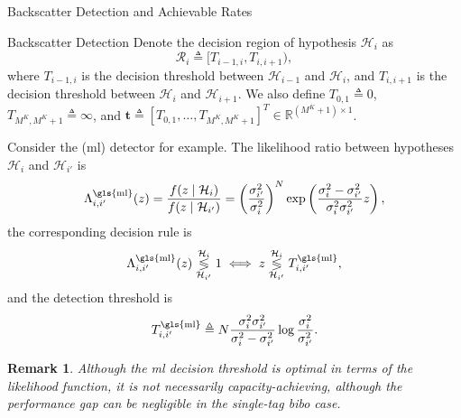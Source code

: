 \documentclass[journal]{IEEEtran}
\newtheorem{remark}{Remark}
\begin{document}
\begin{section}{Backscatter Detection and Achievable Rates}
\begin{subsection}{Backscatter Detection}
			Denote the decision region of hypothesis $\mathcal{H}_i$ as
			\begin{equation}
				\mathcal{R}_i \triangleq [T_{i-1,i}, T_{i,i+1}),
				\label{eq:decision_region}
			\end{equation}
			where $T_{i-1,i}$ is the decision threshold between $\mathcal{H}_{i-1}$ and $\mathcal{H}_i$, and $T_{i,i+1}$ is the decision threshold between $\mathcal{H}_i$ and $\mathcal{H}_{i+1}$. We also define $T_{0,1} \triangleq 0$, $T_{M^K,M^K+1} \triangleq \infty$, and $\boldsymbol{t} \triangleq [T_{0,1},\ldots,T_{M^K,M^K+1}]^T \in \mathbb{R}^{(M^K + 1) \times 1}$.

			Consider the (\gls{ml}) detector for example. The likelihood ratio between hypotheses $\mathcal{H}_i$ and $\mathcal{H}_{i'}$ is \cite{Qian2019}
			\begin{equation}
				\Lambda_{i,{i'}}^{\mathrm{\gls{ml}}}(z) = \frac{f(z \mid \mathcal{H}_i)}{f(z \mid \mathcal{H}_{i'})} = \left( \frac{\sigma_{i'}^2}{\sigma_i^2} \right)^N \exp \left( \frac{\sigma_i^2 - \sigma_{i'}^2}{\sigma_i^2 \sigma_{i'}^2} z \right),
				\label{eq:likelihood_ratio}
			\end{equation}
			the corresponding decision rule is
			\begin{equation}
				\Lambda_{i,{i'}}^{\mathrm{\gls{ml}}}(z) \underset{\mathcal{H}_{i'}}{\overset{\mathcal{H}_i}{\lessgtr}} 1 \iff z \underset{\mathcal{H}_{i'}}{\overset{\mathcal{H}_i}{\lessgtr}} T_{i,{i'}}^{\mathrm{\gls{ml}}},
				\label{eq:decision_rule}
			\end{equation}
			and the detection threshold is
			\begin{equation}
				T_{i,{i'}}^{\mathrm{\gls{ml}}} \triangleq N \frac{\sigma_i^2 \sigma_{i'}^2}{\sigma_i^2 - \sigma_{i'}^2} \log \frac{\sigma_i^2}{\sigma_{i'}^2}.
				\label{eq:detection_threshold}
			\end{equation}

			\begin{remark}
				Although the \gls{ml} decision threshold is optimal in terms of the likelihood function, it is not necessarily capacity-achieving, although the performance gap can be negligible in the single-tag \gls{bibo} case.
			\end{remark}


\end{subsection}
\end{section}
\end{document}
